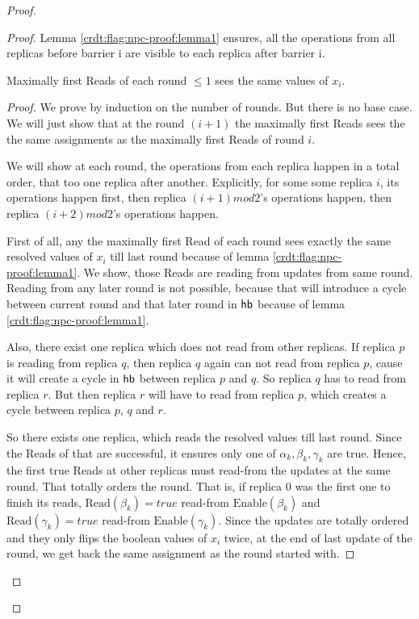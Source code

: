 \begin{proof}
\begin{proof}
Lemma \ref{crdt:flag:npc-proof:lemma1} ensures, all the operations from all replicas before barrier i are visible to each replica after barrier i.

  \begin{lemma}
    \label{crdt:flag:npc-proof:lemma2}
    Maximally first \textrm{Read}s of each round $\leq1$ sees the same values of $x_i$.
  \end{lemma}

  \begin{proof}
    We prove by induction on the number of rounds. But there is no base case. We will just show that at the round $(i+1)$ the maximally first \textrm{Read}s sees the the same assignments as the maximally first \textrm{Read}s of round $i$.

    We will show at each round, the operations from each replica happen in a total order, that too one replica after another. Explicitly, for some some replica $i$, its operations happen first, then replica $(i+1)mod2$'s operations happen, then replica $(i+2)mod 2$'s operations happen. 

    First of all, any the maximally first \textrm{Read} of each round sees exactly the same resolved values of $x_i$ till last round because of lemma \ref{crdt:flag:npc-proof:lemma1}. We show, those \textrm{Read}s are reading from updates from same round. Reading from any later round is not possible, because that will introduce a cycle between current round and that later round in $\textsf{hb}$ because of lemma \ref{crdt:flag:npc-proof:lemma1}.

    Also, there exist one replica which does not read from other replicas. If replica $p$ is reading from replica $q$, then replica $q$ again can not read from replica $p$, cause it will create a cycle in $\textsf{hb}$ between replica $p$ and $q$. So replica $q$ has to read from replica $r$. But then replica $r$ will have to read from replica $p$, which creates a cycle between replica $p$, $q$ and $r$.

    So there exists one replica, which reads the resolved values till last round. Since the \textrm{Read}s of that are successful, it ensures only one of $\alpha_k, \beta_k, \gamma_k$ are true. Hence, the first true \textrm{Read}s at other replicas must read-from the updates at the same round. That totally orders the round. That is, if replica 0 was the first one to finish its reads, $\mathrm{Read}(\beta_k) = true$ read-from $\mathrm{Enable}(\beta_k)$ and $\mathrm{Read}(\gamma_k) = true$ read-from $\mathrm{Enable}(\gamma_k)$. Since the updates are totally ordered and they only flips the boolean values of $x_i$ twice, at the end of last update of the round, we get back the same assignment as the round started with.
  \end{proof}


\end{proof}
\end{proof}
